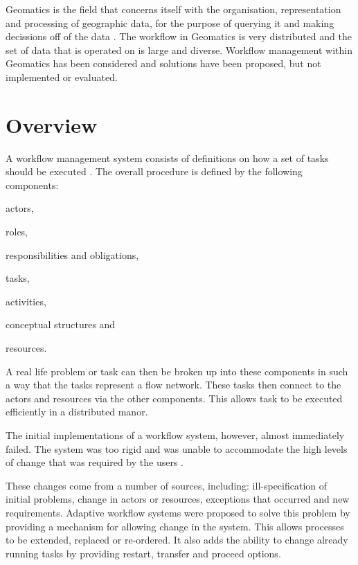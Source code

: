 \documentclass[12pt,a4paper]{report}
\begin{document}
    Geomatics is the field that concerns itself with the organisation,
    representation and processing of geographic data, for the purpose of
    querying it and making decissions off of the data
    \cite{DiMartino:2007:TAG:1341012.1341081}. The workflow in Geomatics is
    very distributed and the set of data that is operated on is large and
    diverse.  Workflow management within Geomatics has been considered and
    solutions have been proposed, but not implemented or
    evaluated\cite{Migliorini:2011:WTG:1999320.1999356}.


\section{Overview}
A workflow management system consists of definitions on how a set of tasks
should be executed \cite{springerlink:10.1007/BF00136712,vanderAalst2002125}.
The overall procedure is defined by the following components:
\begin{inparaenum}[(i)] \item actors, \item roles, \item responsibilities and
obligations, \item tasks, \item activities,\item conceptual structures and
\item resources.\end{inparaenum}

A real life problem or task can then be broken up into these components in
such a way that the tasks represent a flow network. These tasks then connect to
the actors and resources via the other
components\cite[p.~4]{Taylor:2006:WES:1196459}.  This allows task to be
executed efficiently in a distributed manor.

The initial implementations of a workflow system, however, almost
immediately failed. The system was too rigid and was unable to accommodate the
high levels of change that was required by the users
\cite{Suchman:1983:OPP:357442.357445}.

These changes come from a number of sources, including: ill-specification
of initial problems, change in actors or resources, exceptions that occurred
and new requirements.  Adaptive workflow systems were proposed to solve this
problem by providing a mechanism for allowing change in the
system\cite{vanderAalst2002125}. This allows processes to be extended, replaced
or re-ordered. It also adds the ability to change already running tasks by
providing restart, transfer and proceed options.
\end{document}
